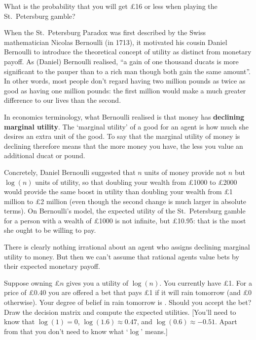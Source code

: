 \begin{exercise1}
  What is the probability that you will get £16 or less when playing
  the St.\ Petersburg gamble?
\end{exercise1}

When the St.\ Petersburg Paradox was first described by the Swiss
mathematician Nicolas Bernoulli (in 1713), it motivated his cousin
Daniel Bernoulli to introduce the theoretical concept of utility as
distinct from monetary payoff. As (Daniel) Bernoulli realised, ``a
gain of one thousand ducats is more significant to the pauper than to
a rich man though both gain the same amount''. In other words, most
people don't regard having two million pounds as twice as good as
having one million pounds: the first million would make a much greater
difference to our lives than the second.

In economics terminology, what Bernoulli realised is that money has
\textbf{declining marginal utility}. The `marginal utility' of a good
for an agent is how much she desires an extra unit of the good. To say
that the marginal utility of money is declining therefore means that
the more money you have, the less you value an additional ducat or pound.

Concretely, Daniel Bernoulli suggested that $n$ units of money provide
not $n$ but $\log(n)$ units of utility, so that doubling your wealth
from £1000 to £2000 would provide the same boost in utility than
doubling your wealth from £1 million to £2 million (even though the
second change is much larger in absolute terms). On Bernoulli's model,
the expected utility of the St.\ Petersburg gamble for a person with a
wealth of £1000 is not infinite, but £10.95: that is the most she
ought to be willing to pay.

There is clearly nothing irrational about an agent who assigns
declining marginal utility to money. But then we can't assume that
rational agents value bets by their expected monetary payoff.

\begin{exercise2}
  Suppose owning £$n$ gives you a utility of $\log(n)$. You currently
  have £1. For a price of £0.40 you are offered a bet that pays £1 if
  it will rain tomorrow (and £0 otherwise). Your degree of belief in
  rain tomorrow is . Should you accept the bet?  Draw
  the decision matrix and compute the expected utilities. [You'll need
  to know that $\log(1) = 0$, $\log(1.6) \approx 0.47$, and $\log(0.6)
  \approx -0.51$. Apart from that you don't need to know what `$\log$'
  means.] 
\end{exercise2}

